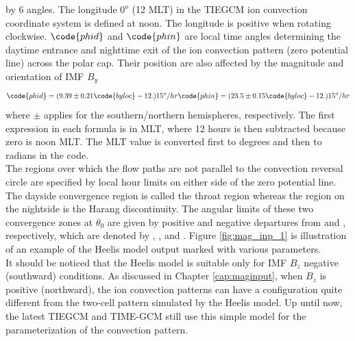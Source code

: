 \begin{enumerate}
\begin{enumerate}
by 6 angles. The longitude $0^o$ (12 MLT) in the TIEGCM 
ion convection coordinate system is defined at noon. 
The longitude is positive when rotating clockwise.  
$\code{phid}$ and $\code{phin}$ are local time angles determining the daytime 
entrance and nighttime exit of the ion convection pattern 
(zero potential line) across the polar cap. Their position 
are also affected by the magnitude and orientation of IMF $B_y$
%
\begin{equation}
   \code{phid} = (9.39 \pm 0.21 \code{byloc} - 12.) 15^o/hr
   \code{phin} = (23.5 \pm 0.15 \code{byloc} - 12.) 15^o/hr
    \label{eq:maginp_10}
\end{equation}
% 
where $\pm$ applies for the southern/northern hemispheres, respectively.
The first expression in each formula is in MLT, where 12 hours is then
subtracted because zero is noon MLT.  The MLT value is converted first to degrees
and then to radians in the code. \\
%
The regions over which the flow paths are not parallel to the 
convection reversal circle are specified by local hour limits 
on either side of the zero potential line. The dayside convergence 
region is called the throat region whereas the region on the nightside 
is the Harang discontinuity. The angular limits of these two convergence 
zones at $\theta_0$ are given by positive and negative departures from  and , 
respectively, which are denoted by , ,  
and . Figure \ref{fig:mag_inp_1} is illustration 
of an example of the Heelis model output marked with various parameters. \\
%
It should be noticed that the Heelis model is suitable only 
for IMF $B_z$ negative (southward) conditions. As discussed in 
Chapter \ref{cap:maginput}, when $B_z$ is positive (northward), the ion 
convection patterns can have a configuration quite 
different from the two-cell pattern simulated by the 
Heelis model. Up until now, the latest TIEGCM and TIME-GCM 
still use this simple model for the parameterization of the 
convection pattern.  
%
\begin{figure}
  \centering

\end{figure}
\end{enumerate}
\end{enumerate}
